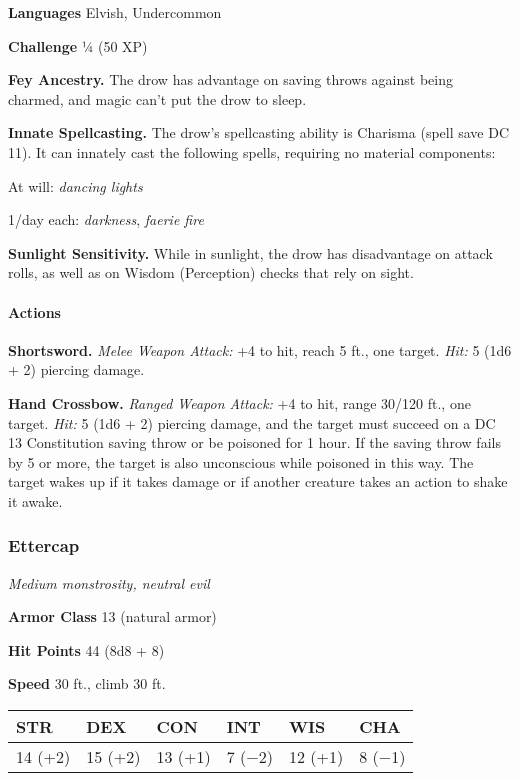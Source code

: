 \documentclass[
]{article}
\begin{document}
\textbf{Languages} Elvish, Undercommon

\textbf{Challenge} ¼ (50 XP)

\textbf{Fey Ancestry.} The drow has advantage on saving throws against
being charmed, and magic can't put the drow to sleep.

\textbf{Innate Spellcasting.} The drow's spellcasting ability is
Charisma (spell save DC 11). It can innately cast the following spells,
requiring no material components:

At will: \emph{dancing lights}

1/day each: \emph{darkness}, \emph{faerie fire}

\textbf{Sunlight Sensitivity.} While in sunlight, the drow has
disadvantage on attack rolls, as well as on Wisdom (Perception) checks
that rely on sight.

\hypertarget{actions-4}{%
\paragraph{Actions}\label{actions-4}}

\textbf{Shortsword.} \emph{Melee Weapon Attack:} +4 to hit, reach 5 ft.,
one target. \emph{Hit:} 5 (1d6 + 2) piercing damage.

\textbf{Hand Crossbow.} \emph{Ranged Weapon Attack:} +4 to hit, range
30/120 ft., one target. \emph{Hit:} 5 (1d6 + 2) piercing damage, and the
target must succeed on a DC 13 Constitution saving throw or be poisoned
for 1 hour. If the saving throw fails by 5 or more, the target is also
unconscious while poisoned in this way. The target wakes up if it takes
damage or if another creature takes an action to shake it awake.

\hypertarget{ettercap}{%
\subsubsection{Ettercap}\label{ettercap}}

\emph{Medium monstrosity, neutral evil}

\textbf{Armor Class} 13 (natural armor)

\textbf{Hit Points} 44 (8d8 + 8)

\textbf{Speed} 30 ft., climb 30 ft.

\begin{longtable}[]{@{}llllll@{}}
\toprule
STR & DEX & CON & INT & WIS & CHA\tabularnewline
\midrule
\endhead
14 (+2) & 15 (+2) & 13 (+1) & 7 (−2) & 12 (+1) & 8 (−1)\tabularnewline
\bottomrule
\end{longtable}
\end{document}
